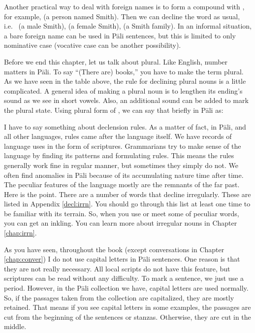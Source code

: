 Another practical way to deal with foreign names is to form a compound with , for example,  (a person named Smith). Then we can decline the word as usual, i.e.\  (a male Smith),  (a female Smith),  (a Smith family). In an informal situation, a bare foreign name can be used in P\=ali sentences, but this is limited to only nominative case (vocative case can be another possibility).

Before we end this chapter, let us talk about plural. Like English, number matters in P\=ali. To say ``(There are) books,'' you have to make the term plural. As we have seen in the table above, the rule for declining plural nouns is a little complicated. A general idea of making a plural noun is to lengthen its ending's sound as we see in short vowels. Also, an additional sound can be added to mark the plural state. Using plural form of , we can say that briefly in P\=ali as:


I have to say something about declension rules. As a matter of fact, in P\=ali, and all other languages, rules came after the language itself. We have records of language uses in the form of scriptures. Grammarians try to make sense of the language by finding its patterns and formulating rules. This means the rules generally work fine in regular manner, but sometimes they simply do not. We often find anomalies in P\=ali because of its accumulating nature time after time. The peculiar features of the language mostly are the remnants of the far past. Here is the point. There are a number of words that decline irregularly. These are listed in Appendix \ref{decl:irrn}. You should go through this list at least one time to be familiar with its terrain. So, when you use or meet some of peculiar words, you can get an inkling. You can learn more about irregular nouns in Chapter \ref{chap:irrn}.

As you have seen, throughout the book (except conversations in Chapter \ref{chap:conver}) I do not use capital letters in P\=ali sentences. One reason is that they are not really necessary. All local scripts do not have this feature, but scriptures can be read without any difficulty. To mark a sentence, we just use a period. However, in the P\=ali collection we have, capital letters are used normally. So, if the passages taken from the collection are capitalized, they are mostly retained. That means if you see capital letters in some examples, the passages are cut from the beginning of the sentences or stanzas. Otherwise, they are cut in the middle.

